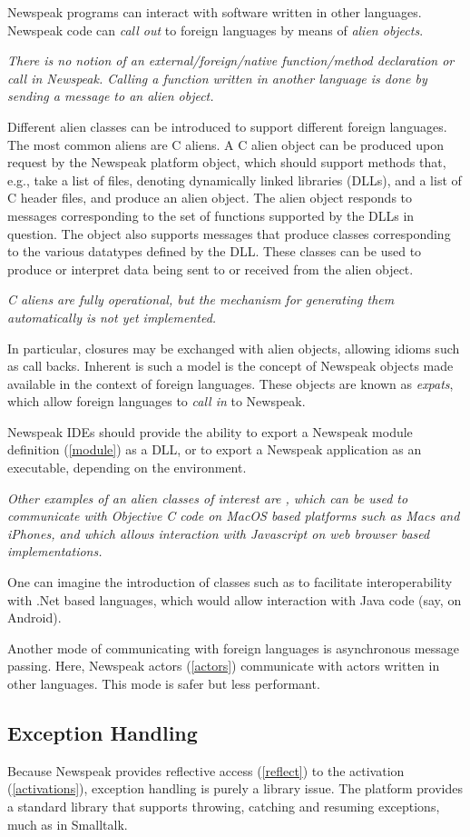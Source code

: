 \documentclass{article}
\begin{document}
Newspeak programs can interact with software written in other languages. Newspeak code can {\em call out} to foreign languages by means of {\em alien objects}. 

{\it
There is no notion of an external/foreign/native function/method declaration or call in Newspeak.
Calling a function written in another language is done by sending a message to an alien object.
}

Different alien classes can be introduced to support different foreign languages. The most common aliens are C aliens. A C alien object can be produced upon request by the Newspeak platform object, which should
support methods that, e.g., take a list of files, denoting dynamically linked libraries (DLLs), and a list of C header files, and produce an alien object. The alien object  responds to messages corresponding to the set of functions supported by the DLLs in question.  The object also supports messages
that produce classes corresponding to the various datatypes defined by the DLL.  These classes can be used to produce or interpret data being sent to or received from the alien object.

{\it C aliens are fully operational, but the mechanism for generating them automatically is not yet implemented.}

In particular, closures may be exchanged with alien objects, allowing idioms such as call backs. Inherent is such a model is the concept of Newspeak objects made available in the context of foreign languages. These objects are known as {\em expats}, which allow 
foreign languages to {\em call in} to Newspeak.

Newspeak IDEs should provide the ability to export a Newspeak module definition  (\ref{module}) as a DLL, or to export a Newspeak application as an executable, depending on the environment.

{\it 
Other examples of an alien classes of interest are , which can be used to communicate with Objective C code on MacOS based platforms such as Macs and iPhones, and
 which allows interaction with Javascript on web browser based implementations.

One can imagine the introduction of classes such as  to facilitate interoperability with .Net based languages,  which would allow interaction with Java code (say, on Android). 
}

Another mode of communicating with foreign languages is asynchronous message passing. Here, Newspeak actors (\ref{actors}) communicate with actors written in other languages. This mode is safer but less performant.

\subsection{Exception Handling}
\label{exceptions}

Because Newspeak provides reflective access (\ref{reflect}) to the activation (\ref{activations}), exception handling is purely a library issue. The platform provides a standard library that supports throwing, catching and resuming exceptions, much as in Smalltalk.


 
\end{document}

